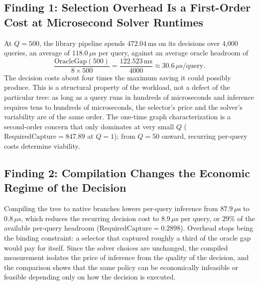 \documentclass[conference]{IEEEtran}
\begin{document}
\subsection{Finding 1: Selection Overhead Is a First-Order Cost at Microsecond Solver Runtimes}
At $Q=500$, the library pipeline spends $472.04\,\mathrm{ms}$ on its decisions over 4,000 queries, an average of $118.0\,\mu\mathrm{s}$ per query, against an average oracle headroom of
\begin{equation}
\frac{\mathrm{OracleGap}(500)}{8 \times 500} = \frac{122.523\,\mathrm{ms}}{4000} \approx 30.6\,\mu\mathrm{s}/\mathrm{query}.
\end{equation}
The decision costs about four times the maximum saving it could possibly produce. This is a structural property of the workload, not a defect of the particular tree: as long as a query runs in hundreds of microseconds and inference requires tens to hundreds of microseconds, the selector's price and the solver's variability are of the same order. The one-time graph characterization is a second-order concern that only dominates at very small $Q$ ($\mathrm{RequiredCapture} = 847.89$ at $Q=1$); from $Q=50$ onward, recurring per-query costs determine viability.

\subsection{Finding 2: Compilation Changes the Economic Regime of the Decision}
Compiling the tree to native branches lowers per-query inference from $87.9\,\mu\mathrm{s}$ to $0.8\,\mu\mathrm{s}$, which reduces the recurring decision cost to $8.9\,\mu\mathrm{s}$ per query, or $29\%$ of the available per-query headroom ($\mathrm{RequiredCapture}=0.2898$). Overhead stops being the binding constraint: a selector that captured roughly a third of the oracle gap would pay for itself. Since the solver choices are unchanged, the compiled measurement isolates the price of inference from the quality of the decision, and the comparison shows that the same policy can be economically infeasible or feasible depending only on how the decision is executed.
\end{document}
